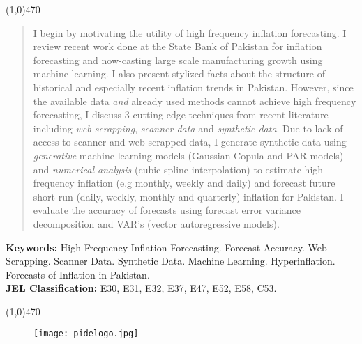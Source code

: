 \documentclass[12pt]{article}
\newcommand{\1}{\mathbbm 1}
\begin{document}
		\begin{center}
			\line(1,0){470}
		\end{center}
		\begin{spacing}{1.1}
			\vspace{-3ex}
			\begin{abstract}
				\noindent 
				I begin by motivating the utility of high frequency inflation forecasting. I review recent work done at the State Bank of Pakistan for inflation forecasting and now-casting large scale manufacturing growth using machine learning. I also present stylized facts about the structure of historical and especially recent inflation trends in Pakistan. However, since the available data \textit{and} already used methods cannot achieve high frequency forecasting, I discuss $3$ cutting edge techniques from recent literature including \textit{web scrapping}, \textit{scanner data} and \textit{synthetic data}. Due to lack of access to scanner and web-scrapped data, I generate synthetic data using \textit{generative} machine learning models (Gaussian Copula and PAR models) and \textit{numerical analysis} (cubic spline interpolation) to estimate high frequency inflation (e.g monthly, weekly and daily) and forecast future short-run (daily, weekly, monthly and quarterly) inflation for Pakistan. I evaluate the accuracy of forecasts using forecast error variance decomposition and VAR's (vector autoregressive models). 
				
			\end{abstract}
		\end{spacing}
		\textbf{Keywords:} High Frequency Inflation Forecasting. Forecast Accuracy. Web Scrapping. Scanner Data. Synthetic Data. Machine Learning. Hyperinflation. Forecasts of Inflation in Pakistan. {}\\
		\textbf{JEL Classification:} E30, E31, E32, E37, E47, E52, E58, C53.
		\\
		\begin{center}
			\vspace{-8ex}
			\line(1,0){470}
		\end{center}
		\baselineskip=18pt 
		
		\newpage{}
		
		\begin{figure}[H]
			\begin{center}
				\texttt{[image: pidelogo.jpg]}		
				\caption*{}
			\end{center}
		\end{figure}
		
\end{document}
